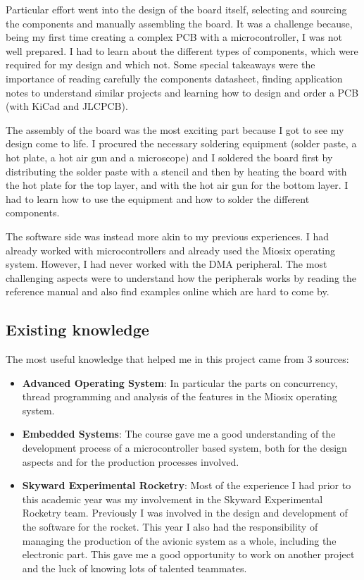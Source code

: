 Particular effort went into the design of the board itself, selecting and sourcing the components and manually assembling the board. It was a challenge because, being my first time creating a complex PCB with a microcontroller, I was not well prepared. I had to learn about the different types of components, which were required for my design and which not. Some special takeaways were the importance of reading carefully the components datasheet, finding application notes to understand similar projects and learning how to design and order a PCB (with KiCad and JLCPCB).

\bigbreak

The assembly of the board was the most exciting part because I got to see my design come to life. I procured the necessary soldering equipment (solder paste, a hot plate, a hot air gun and a microscope) and I soldered the board first by distributing the solder paste with a stencil and then by heating the board with the hot plate for the top layer, and with the hot air gun for the bottom layer. I had to learn how to use the equipment and how to solder the different components.

\bigbreak

The software side was instead more akin to my previous experiences. I had already worked with microcontrollers and already used the Miosix operating system. However, I had never worked with the DMA peripheral. The most challenging aspects were to understand how the peripherals works by reading the reference manual and also find examples online which are hard to come by.

\subsection{Existing knowledge}

The most useful knowledge that helped me in this project came from 3 sources:
\begin{itemize}
      \item \textbf{Advanced Operating System}: In particular the parts on concurrency, thread programming and analysis of the features in the Miosix operating system.
      \item \textbf{Embedded Systems}: The course gave me a good understanding of the development process of a microcontroller based system, both for the design aspects and for the production processes involved.
      \item \textbf{Skyward Experimental Rocketry}: Most of the experience I had prior to this academic year was my involvement in the Skyward Experimental Rocketry team. Previously I was involved in the design and development of the software for the rocket. This year I also had the responsibility of managing the production of the avionic system as a whole, including the electronic part. This gave me a good opportunity to work on another project and the luck of knowing lots of talented teammates.
\end{itemize}

